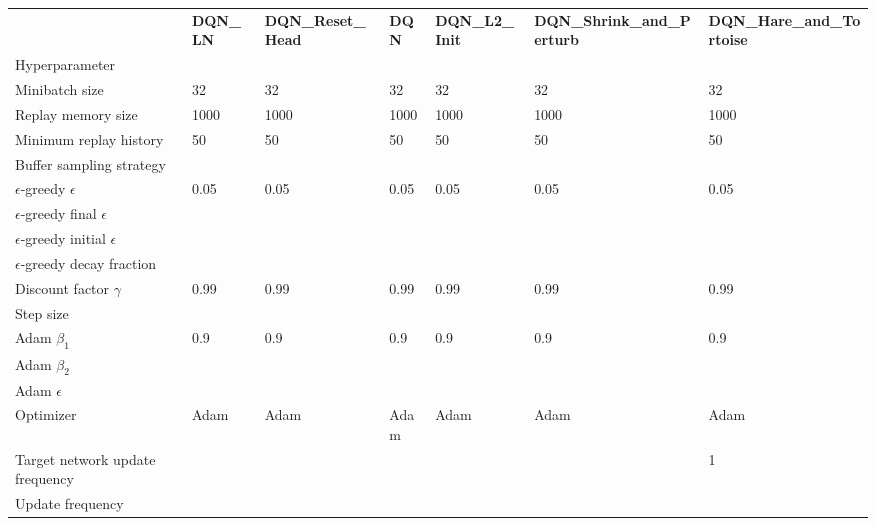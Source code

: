 \begin{tabular}{lllllll}
 & \bfseries DQN_LN & \bfseries DQN_Reset_Head & \bfseries DQN & \bfseries DQN_L2_Init & \bfseries DQN_Shrink_and_Perturb & \bfseries DQN_Hare_and_Tortoise \\
Hyperparameter &  &  &  &  &  &  \\
Minibatch size & 32 & 32 & 32 & 32 & 32 & 32 \\
Replay memory size & 1000 & 1000 & 1000 & 1000 & 1000 & 1000 \\
Minimum replay history & 50 & 50 & 50 & 50 & 50 & 50 \\
Buffer sampling strategy &  &  &  &  &  &  \\
$\epsilon$-greedy $\epsilon$ & 0.05 & 0.05 & 0.05 & 0.05 & 0.05 & 0.05 \\
$\epsilon$-greedy final $\epsilon$ &  &  &  &  &  &  \\
$\epsilon$-greedy initial $\epsilon$ &  &  &  &  &  &  \\
$\epsilon$-greedy decay fraction &  &  &  &  &  &  \\
Discount factor $\gamma$ & 0.99 & 0.99 & 0.99 & 0.99 & 0.99 & 0.99 \\
Step size &  &  &  &  &  &  \\
Adam $\beta_1$ & 0.9 & 0.9 & 0.9 & 0.9 & 0.9 & 0.9 \\
Adam $\beta_2$ &  &  &  &  &  &  \\
Adam $\epsilon$ &  &  &  &  &  &  \\
Optimizer & Adam & Adam & Adam & Adam & Adam & Adam \\
Target network update frequency &  &  &  &  &  & 1 \\
Update frequency &  &  &  &  &  &  \\
\end{tabular}
